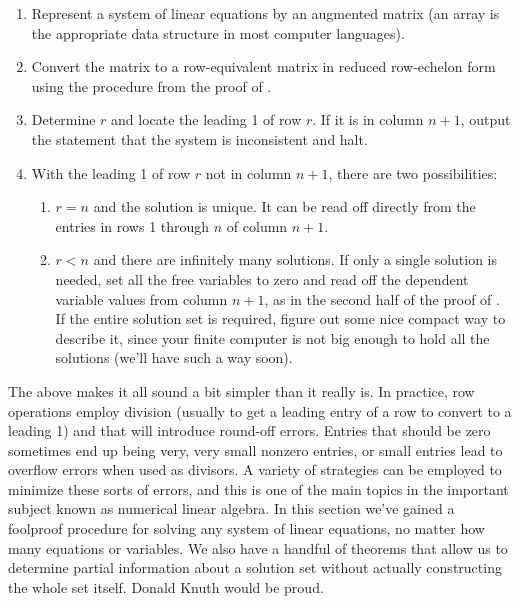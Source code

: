 %
\begin{enumerate}
\item  Represent a system of linear equations by an augmented matrix (an array is the appropriate data structure in most computer languages).
\item  Convert the matrix to a row-equivalent matrix in reduced row-echelon form using the procedure from the proof of .
\item  Determine $r$ and locate the leading 1 of row $r$.  If it is in column $n+1$, output the statement that the system is inconsistent and halt.
\item With the leading 1 of row $r$ not in column $n+1$, there are two possibilities:
\begin{enumerate}
\item $r=n$ and the solution is unique.  It can be read off directly from the entries in rows 1 through $n$ of column $n+1$.
\item $r<n$ and there are infinitely many solutions.  If only a single solution is needed, set all the free variables to zero and read off the dependent variable values from column $n+1$, as in the second half of the proof of .  If the entire solution set is required, figure out some nice compact way to describe it, since your finite computer is not big enough to hold all the solutions (we'll have such a way soon).
\end{enumerate}
\end{enumerate}
%
The above makes it all sound a bit simpler than it really is.  In practice, row operations employ division (usually to get a leading entry of a row to convert to a leading 1) and that will introduce round-off errors.  Entries that should be zero sometimes end up being very, very small nonzero entries, or small entries lead to overflow errors when used as divisors.  A variety of strategies can be employed to minimize these sorts of errors, and this is one of the main topics in the important subject known as numerical linear algebra.
%
In this section we've gained a foolproof procedure for solving any system of linear equations, no matter how many equations or variables.  We also have a handful of theorems that allow us to determine partial information about a solution set without actually constructing the whole set itself.  Donald Knuth would be proud.
%
%


